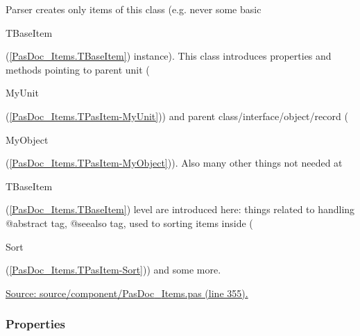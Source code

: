 \documentclass{report}
\begin{document}
Parser creates only items of this class (e.g. never some basic \begin{ttfamily}TBaseItem\end{ttfamily}(\ref{PasDoc_Items.TBaseItem}) instance). This class introduces properties and methods pointing to parent unit (\begin{ttfamily}MyUnit\end{ttfamily}(\ref{PasDoc_Items.TPasItem-MyUnit})) and parent class/interface/object/record (\begin{ttfamily}MyObject\end{ttfamily}(\ref{PasDoc_Items.TPasItem-MyObject})). Also many other things not needed at \begin{ttfamily}TBaseItem\end{ttfamily}(\ref{PasDoc_Items.TBaseItem}) level are introduced here: things related to handling @abstract tag, @seealso tag, used to sorting items inside (\begin{ttfamily}Sort\end{ttfamily}(\ref{PasDoc_Items.TPasItem-Sort})) and some more.\par
\href{https://github.com/pasdoc/pasdoc/blob/master/source/component/PasDoc_Items.pas#L355}{Source: source/component/PasDoc{\_}Items.pas (line 355).}\subsubsection*{\large{\textbf{Properties}}\normalsize\hspace{1ex}\hfill}
\end{document}
